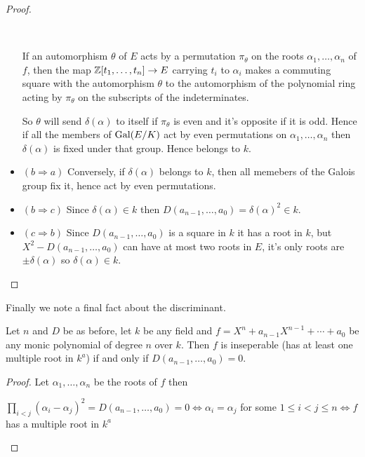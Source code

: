 \begin{bergman}
\begin{proof}
\begin{itemize}
        \
  
        If an automorphism $\theta$ of $E$ acts by a permutation $\pi_\theta$ on the roots $\alpha_1,\ldots,\alpha_n$ of $f$, then the map $\mathbb{Z}[t_1,\ldots,t_n] \rightarrow E$ carrying $t_i$ to $\alpha_i$ makes a commuting square with the automorphism $\theta$ to the automorphism of the polynomial ring acting by $\pi_\theta$ on the subscripts of the indeterminates. 
  
        So $\theta$ will send $\delta(\alpha)$ to itself if $\pi_\theta$ is even and it's opposite if it is odd. Hence if all the members of $\text{Gal}(E/K)$ act by even permutations on $\alpha_1,\ldots,\alpha_n$ then $\delta(\alpha)$ is fixed under that group. Hence belongs to $k$. 
        \item $(b\Rightarrow a)$ Conversely, if $\delta(\alpha)$ belongs to $k$, then all memebers of the Galois group fix it, hence act by even permutations.
        \item $(b\Rightarrow c)$ Since $\delta(\alpha)\in k$ then $D(a_{n-1},\ldots,a_0) = {\delta(\alpha)}^2\in k$.
        \item $(c\Rightarrow b)$ Since $D(a_{n-1},\ldots,a_0)$ is a square in $k$ it has a root in $k$, but $X^2 - D(a_{n-1},\ldots,a_0)$ can have at most two roots in $E$, it's only roots are $\pm \delta(\alpha)$ so $\delta(\alpha)\in k$.
      \end{itemize}
    \end{proof}
    Finally we note a final fact about the discriminant.\begin{lemma}
      Let $n$ and $D$ be as before, let $k$ be any field and $f = X^n+a_{n-1}X^{n-1}+\cdots+a_0$ be any monic polynomial of degree $n$ over $k$. Then $f$ is inseperable (has at least one multiple root in $k^a$) if and only if $D(a_{n-1},\ldots,a_0) = 0$.
    \end{lemma}
    \begin{proof}
      Let $\alpha_1,\ldots,\alpha_n$ be the roots of $f$ then \begin{center}$\prod_{i<j}{(\alpha_i-\alpha_j)}^2 = D(a_{n-1},\ldots,a_0) = 0 \iff \alpha_i=\alpha_j$ for some $1\leq i<j\leq n \iff f$ has a multiple root in $k^a$\end{center}
    \end{proof}
	\end{bergman}
